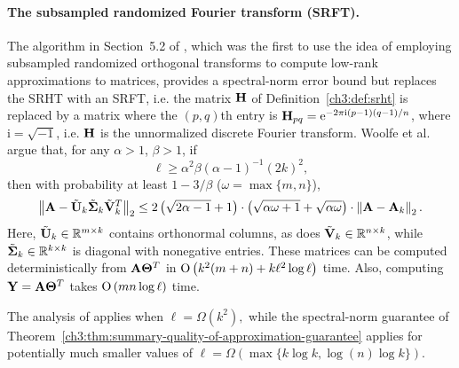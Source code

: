 \paragraph{The subsampled randomized Fourier transform (SRFT).}
The algorithm in Section~5.2 of \cite{WLRT08},
which was the first to use the idea of employing subsampled randomized orthogonal transforms to compute low-rank approximations to matrices,
provides a spectral-norm error bound but replaces the SRHT with an SRFT, i.e. the matrix $\mathbf{H}$ of Definition~\ref{ch3:def:srht} is replaced by a matrix
where the $(p,q)$th entry is $\mathbf{H}_{pq} = \mathrm{e}^{- 2 \pi \mathrm{i} (p-1) (q-1)/n }$, where $\mathrm{i} = \sqrt{-1}$, i.e. $\mathbf{H}$ is the unnormalized discrete Fourier transform.
Woolfe et al.~\cite[Equation 190]{WLRT08} argue that, for any $\alpha > 1$, $\beta > 1$,
if
$$\ell \ge \alpha^2 \beta \left( \alpha-1 \right)^{-1} (2k)^2,$$
then with probability at least $1 - 3/\beta$ ($\omega = \max\{m,n\}$),
$$ \left\| \mathbf{A} - \tilde{\mathbf{U}}_k \tilde{\mathbf{\Sigma}}_k \tilde{\mathbf{V}}_k^T \right\|_2 \le
2 \left( \sqrt{2\alpha-1} + 1 \right) \cdot \left( \sqrt{\alpha \omega +1} + \sqrt{ \alpha \omega } \right) \cdot \left\|\mathbf{A} - \mathbf{A}_k\right\|_2.$$
Here, $\tilde{\mathbf{U}}_k \in \mathbb{R}^{m \times k}$ contains orthonormal columns, as does $\tilde{\mathbf{V}}_k \in \mathbb{R}^{n \times k}$, while
$\tilde{\mathbf{\Sigma}}_k \in \mathbb{R}^{k \times k} $ is diagonal with nonegative entries. These matrices can be computed deterministically from $\mathbf{A} \mathbf{\Theta}^T$
in $\mathrm{O}\left( k^2(m+n) + k \ell^2 \log \ell \right)$ time. Also, computing $\mathbf{Y} = \mathbf{A} \mathbf{\Theta}^T$ takes $\mathrm{O}\left( m n \log \ell \right)$ time.

The analysis of \cite{WLRT08} applies when $\ell = \Omega(k^2),$
while the spectral-norm guarantee of Theorem~\ref{ch3:thm:summary-quality-of-approximation-guarantee}
applies for potentially much smaller values of $\ell = \Omega(\max\{k\log k, \log(n)\log k\}).$ 

